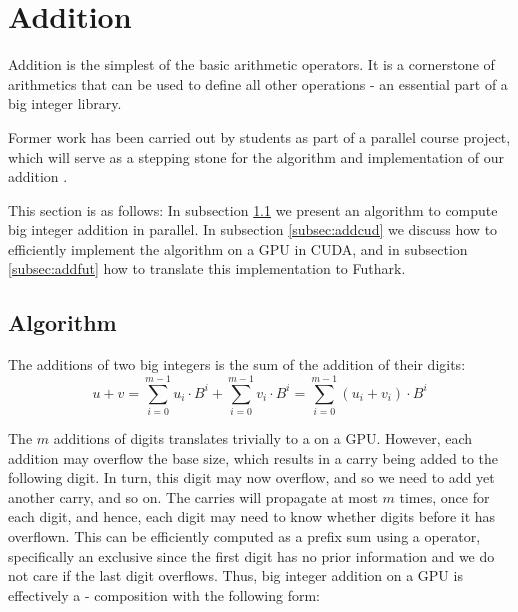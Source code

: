 \section{Addition}
\label{sec:add}

Addition is the simplest of the basic arithmetic operators. It is a cornerstone
of arithmetics that can be used to define all other operations - an essential
part of a big integer library.

Former work has been carried out by students as part of a parallel course
project, which will serve as a stepping stone for the algorithm and
implementation of our addition \cite{DPP-project}.

This section is as follows: In subsection \ref{subsec:addalg} we present an
algorithm to compute big integer addition in parallel. In subsection
\ref{subsec:addcud} we discuss how to efficiently implement the algorithm on a
GPU in CUDA, and in subsection \ref{subsec:addfut} how to translate this
implementation to Futhark.

\subsection{Algorithm}
\label{subsec:addalg}

The additions of two big integers is the sum of the addition of their digits:
\begin{equation}
  \label{eq:add}
  u + v = \sum_{i=0}^{m-1}u_i\cdot B^{i} + \sum_{i=0}^{m-1}v_i\cdot B^{i} = \sum_{i=0}^{m-1}(u_i+v_i)\cdot B^{i}
\end{equation}

The $m$ additions of digits translates trivially to a  on a
GPU. However, each addition may overflow the base size, which results in a carry
being added to the following digit. In turn, this digit may now overflow, and so
we need to add yet another carry, and so on. The carries will propagate at most
$m$ times, once for each digit, and hence, each digit may need to know whether
digits before it has overflown. This can be efficiently computed as a prefix sum
using a  operator, specifically an exclusive  since the
first digit has no prior information and we do not care if the last digit
overflows. Thus, big integer addition on a GPU is effectively a
- composition with the following form:

